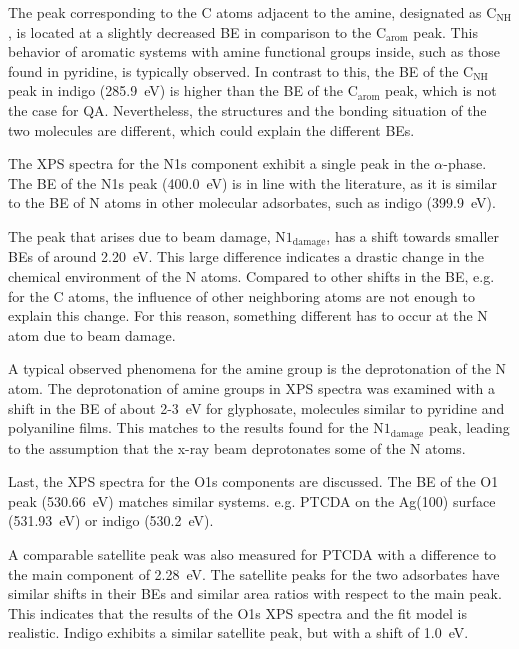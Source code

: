 The peak corresponding to the C atoms adjacent to the amine, designated as $\mathrm{C_{NH}}$, is located at a slightly decreased \ac{BE} in comparison to the $\mathrm{C_{arom}}$ peak. This behavior of aromatic systems with amine functional groups inside, such as those found in pyridine, is typically observed.\autocite{Mendolicchio2019, Bagus2025} In contrast to this, the \ac{BE} of the $\mathrm{C_{NH}}$ peak in indigo (285.9~\si{\eV})\autocite{Brunet2011} is higher than the \ac{BE} of the $\mathrm{C_{arom}}$ peak, which is not the case for \ac{QA}. Nevertheless, the structures and the bonding situation of the two molecules are different, which could explain the different \acp{BE}.

The \ac{XPS} spectra for the N1s component exhibit a single peak in the $\alpha$-phase. The \ac{BE} of the N1s peak (400.0~\si{\eV}) is in line with the literature, as it is similar to the \ac{BE} of N atoms in other molecular adsorbates, such as indigo (399.9~\si{eV}).\autocite{Xu2024}

The peak that arises due to beam damage, $\mathrm{N1_{damage}}$, has a shift towards smaller \acp{BE} of around 2.20~\si{\eV}. This large difference indicates a drastic change in the chemical environment of the N atoms. Compared to other shifts in the \ac{BE}, e.g. for the C atoms, the influence of other neighboring atoms are not enough to explain this change. For this reason, something different has to occur at the N atom due to beam damage.

A typical observed phenomena for the amine group is the deprotonation of the N atom. The deprotonation of amine groups in \ac{XPS} spectra was examined with a shift in the \ac{BE} of about 2-3~\si{\eV} for glyphosate, molecules similar to pyridine and polyaniline films.\autocite{Ruano2021,Kang1990,M.Mahat2015}  This matches to the results found for the $\mathrm{N1_{damage}}$ peak, leading to the assumption that the x-ray beam deprotonates some of the N atoms.

Last, the \ac{XPS} spectra for the O1s components are discussed. The \ac{BE} of the O1 peak (530.66~\si{eV}) matches similar systems. e.g. \ac{PTCDA} on the Ag(100) surface (531.93~\si{eV})\autocite{Bauer2014} or indigo (530.2~\si{eV})\autocite{Xu2024}.

A comparable satellite peak was also measured for \ac{PTCDA} with a difference to the main component of 2.28~\si{eV}.\autocite{Bauer2014} The satellite peaks for the two adsorbates have similar shifts in their \acp{BE} and similar area ratios with respect to the main peak. This indicates that the results of the O1s \ac{XPS} spectra and the fit model is realistic. Indigo exhibits a similar satellite peak, but with a shift of 1.0~\si{\eV}.\autocite{Xu2024}

